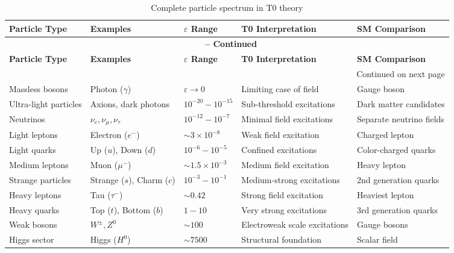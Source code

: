 \documentclass[12pt,a4paper]{article}
\begin{document}
	\begin{longtable}{|p{3cm}|p{2.5cm}|p{2.5cm}|p{3.5cm}|p{3cm}|}
		\caption{Complete particle spectrum in T0 theory} \\
		\hline
		\textbf{Particle Type} & \textbf{Examples} & \textbf{$\varepsilon$ Range} & \textbf{T0 Interpretation} & \textbf{SM Comparison} \\
		\hline
		\endfirsthead
		
		\multicolumn{5}{c}{{\bfseries \tablename\ \thetable{} -- Continued}} \\
		\hline
		\textbf{Particle Type} & \textbf{Examples} & \textbf{$\varepsilon$ Range} & \textbf{T0 Interpretation} & \textbf{SM Comparison} \\
		\hline
		\endhead
		
		\hline
		\multicolumn{5}{r}{{Continued on next page}} \\
		\endfoot
		
		\hline
		\endlastfoot
		
		Massless bosons & Photon ($\gamma$) & $\varepsilon \to 0$ & Limiting case of field & Gauge boson \\
		\hline
		Ultra-light particles & Axions, dark photons & $10^{-20} - 10^{-15}$ & Sub-threshold excitations & Dark matter candidates \\
		\hline
		Neutrinos & $\nu_e, \nu_\mu, \nu_\tau$ & $10^{-12} - 10^{-7}$ & Minimal field excitations & Separate neutrino fields \\
		\hline
		Light leptons & Electron ($e^-$) & $\sim 3 \times 10^{-8}$ & Weak field excitation & Charged lepton \\
		\hline
		Light quarks & Up ($u$), Down ($d$) & $10^{-6} - 10^{-5}$ & Confined excitations & Color-charged quarks \\
		\hline
		Medium leptons & Muon ($\mu^-$) & $\sim 1.5 \times 10^{-3}$ & Medium field excitation & Heavy lepton \\
		\hline
		Strange particles & Strange ($s$), Charm ($c$) & $10^{-3} - 10^{-1}$ & Medium-strong excitations & 2nd generation quarks \\
		\hline
		Heavy leptons & Tau ($\tau^-$) & $\sim 0.42$ & Strong field excitation & Heaviest lepton \\
		\hline
		Heavy quarks & Top ($t$), Bottom ($b$) & $1 - 10$ & Very strong excitations & 3rd generation quarks \\
		\hline
		Weak bosons & $W^{\pm}, Z^0$ & $\sim 100$ & Electroweak scale excitations & Gauge bosons \\
		\hline
		Higgs sector & Higgs ($H^0$) & $\sim 7500$ & Structural foundation & Scalar field \\
		\hline
	\end{longtable}
	
\end{document}
